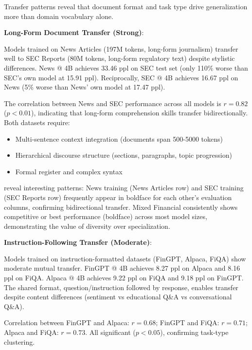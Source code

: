 Transfer patterns reveal that document format and task type drive generalization more than domain vocabulary alone.

\textbf{Long-Form Document Transfer (Strong)}:

Models trained on News Articles (197M tokens, long-form journalism) transfer well to SEC Reports (80M tokens, long-form regulatory text) despite stylistic differences. News @ 4B achieves 33.46 ppl on SEC test set (only 110\% worse than SEC's own model at 15.91 ppl). Reciprocally, SEC @ 4B achieves 16.67 ppl on News (5\% worse than News' own model at 17.47 ppl).

The correlation between News and SEC performance across all models is $r = 0.82$ ($p < 0.01$), indicating that long-form comprehension skills transfer bidirectionally. Both datasets require:
\begin{itemize}
\item Multi-sentence context integration (documents span 500-5000 tokens)
\item Hierarchical discourse structure (sections, paragraphs, topic progression)
\item Formal register and complex syntax
\end{itemize}





 reveal interesting patterns: News training (News Articles row) and SEC training (SEC Reports row) frequently appear in boldface for each other's evaluation columns, confirming bidirectional transfer. Mixed Financial consistently shows competitive or best performance (boldface) across most model sizes, demonstrating the value of diversity over specialization.

\textbf{Instruction-Following Transfer (Moderate)}:

Models trained on instruction-formatted datasets (FinGPT, Alpaca, FiQA) show moderate mutual transfer. FinGPT @ 4B achieves 8.27 ppl on Alpaca and 8.16 ppl on FiQA. Alpaca @ 4B achieves 9.22 ppl on FiQA and 9.18 ppl on FinGPT. The shared format, question/instruction followed by response, enables transfer despite content differences (sentiment vs educational Q\&A vs conversational Q\&A).

Correlation between FinGPT and Alpaca: $r = 0.68$; FinGPT and FiQA: $r = 0.71$; Alpaca and FiQA: $r = 0.73$. All significant ($p < 0.05$), confirming task-type clustering.

